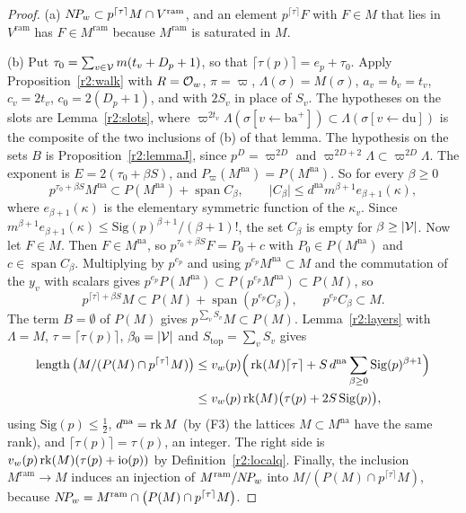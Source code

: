 \begin{proof}
(a) $N\!P_w\subset p^{\lceil\tau\rceil}M\cap V^{\mathrm{ram}}$, and an element $p^{\lceil\tau\rceil}F$ with $F\in M$ that lies in $V^{\mathrm{ram}}$ has $F\in M^{\mathrm{ram}}$ because $M^{\mathrm{ram}}$ is saturated in $M$.

(b) Put $\tau_0=\sum_{v\in\mathcal V}m(t_v+D_p+1)$, so that $\lceil\tau(p)\rceil=e_p+\tau_0$. Apply Proposition~\ref{r2:walk} with $R=\mathcal O_w$, $\pi=\varpi$, $\Lambda(\sigma)=M(\sigma)$, $a_v=b_v=t_v$, $c_v=2t_v$, $c_0=2(D_p+1)$, and with $2S_v$ in place of $S_v$. The hypotheses on the slots are Lemma~\ref{r2:slots}, where $\varpi^{2t_v}\Lambda(\sigma[v\leftarrow\mathrm{ba}^+])\subset\Lambda(\sigma[v\leftarrow\mathrm{du}])$ is the composite of the two inclusions of (b) of that lemma. The hypothesis on the sets $B$ is Proposition~\ref{r2:lemmaJ}, since $p^D=\varpi^{2D}$ and $\varpi^{2D+2}\Lambda\subset\varpi^{2D}\Lambda$. The exponent is $E=2(\tau_0+\beta S)$, and $P_\varpi(M^{\mathrm{na}})=P(M^{\mathrm{na}})$. So for every $\beta\ge0$
\[
p^{\tau_0+\beta S}M^{\mathrm{na}}\subset P(M^{\mathrm{na}})+\operatorname{span}C_\beta,\qquad\lvert C_\beta\rvert\le d^{\mathrm{na}}m^{\beta+1}e_{\beta+1}(\kappa),
\]
where $e_{\beta+1}(\kappa)$ is the elementary symmetric function of the $\kappa_v$. Since $m^{\beta+1}e_{\beta+1}(\kappa)\le\mathrm{Sig}(p)^{\beta+1}/(\beta+1)!$, the set $C_\beta$ is empty for $\beta\ge\lvert\mathcal V\rvert$. Now let $F\in M$. Then $F\in M^{\mathrm{na}}$, so $p^{\tau_0+\beta S}F=P_0+c$ with $P_0\in P(M^{\mathrm{na}})$ and $c\in\operatorname{span}C_\beta$. Multiplying by $p^{e_p}$ and using $p^{e_p}M^{\mathrm{na}}\subset M$ and the commutation of the $y_v$ with scalars gives $p^{e_p}P(M^{\mathrm{na}})\subset P(p^{e_p}M^{\mathrm{na}})\subset P(M)$, so
\[
p^{\lceil\tau\rceil+\beta S}M\subset P(M)+\operatorname{span}(p^{e_p}C_\beta),\qquad p^{e_p}C_\beta\subset M .
\]
The term $B=\emptyset$ of $P(M)$ gives $p^{\sum_vS_v}M\subset P(M)$. Lemma~\ref{r2:layers} with $\Lambda=M$, $\tau=\lceil\tau(p)\rceil$, $\beta_0=\lvert\mathcal V\rvert$ and $S_{\mathrm{top}}=\sum_vS_v$ gives
\[
\begin{aligned}
\operatorname{length}\big(M/(P(M)\cap p^{\lceil\tau\rceil}M)\big)&\le v_w(p)\Big(\operatorname{rk}(M)\lceil\tau\rceil+S\,d^{\mathrm{na}}\sum_{\beta\ge0}\mathrm{Sig}(p)^{\beta+1}\Big)\\ &\le v_w(p)\operatorname{rk}(M)\big(\tau(p)+2S\,\mathrm{Sig}(p)\big),
\end{aligned}
\]
using $\mathrm{Sig}(p)\le\frac12$, $d^{\mathrm{na}}=\operatorname{rk} M$ (by (F3) the lattices $M\subset M^{\mathrm{na}}$ have the same rank), and $\lceil\tau(p)\rceil=\tau(p)$, an integer. The right side is $v_w(p)\operatorname{rk}(M)(\tau(p)+\mathrm{io}(p))$ by Definition~\ref{r2:localq}. Finally, the inclusion $M^{\mathrm{ram}}\to M$ induces an injection of $M^{\mathrm{ram}}/N\!P_w$ into $M/(P(M)\cap p^{\lceil\tau\rceil}M)$, because $N\!P_w=M^{\mathrm{ram}}\cap\big(P(M)\cap p^{\lceil\tau\rceil}M\big)$.
\end{proof}

